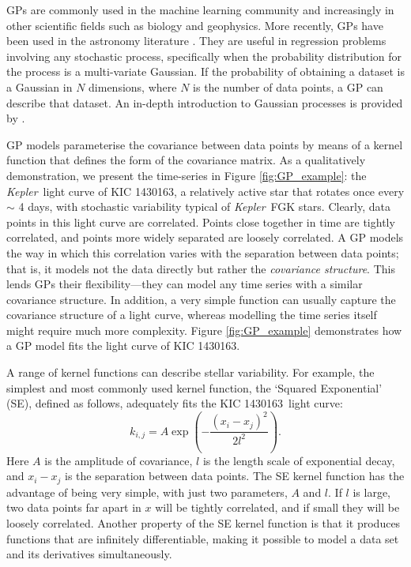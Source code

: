 \documentclass[useAMS, usenatbib, preprint, 12pt]{aastex}
\newcommand{\kepexample}{1430163}
\newcommand{\Kepler}{{\it Kepler}}
\newcommand{\kepler}{\Kepler}
\newcommand{\eg}{{\it e.g.}}
\begin{document}
GPs are commonly used in the machine learning community and increasingly
in other scientific fields such as biology and geophysics.
More recently, GPs have been used in the astronomy literature \citep[see
\eg][]{Gibson2012, Haywood2014, Haywood2015, Evans2015, Rajpaul2015,
Rajpaul2016, Aigrain2016}.
They are useful in regression problems involving any stochastic process,
specifically when the probability distribution for the process is a
multi-variate Gaussian.
If the probability of obtaining a dataset is a Gaussian in $N$ dimensions,
where $N$ is the number of data points, a GP can describe that dataset. 
An in-depth introduction to Gaussian processes is provided by
\citet{Rasmussen2005}.

GP models parameterise the covariance between data points by means of a kernel
function that defines the form of the covariance matrix.
As a qualitatively demonstration, we present the time-series 
in Figure \ref{fig:GP_example}: 
the \kepler\ light curve of KIC \kepexample, a relatively active star that
rotates once every $\sim$ 4 days, with stochastic variability typical of 
\kepler\ FGK stars.
Clearly, data points in this light curve are correlated.
Points close together in time are tightly correlated, and points more
widely separated are loosely correlated.
A GP models the way in which this correlation varies with the separation between 
data points; that is, it models not the data directly but rather the {\it 
covariance structure}.
This lends GPs their flexibility---they can model any time
series with a similar covariance structure.
In addition, a very simple function can usually capture the covariance
structure of a light curve, whereas modelling the time series itself
might require much more complexity.
Figure \ref{fig:GP_example} demonstrates how a GP model fits the light curve of 
KIC \kepexample.

A range of kernel functions can describe stellar variability.
For example, the simplest and most commonly used kernel function, the `Squared
Exponential' (SE), defined as follows, adequately fits the 
KIC \kepexample\ light curve:
\begin{equation}
k_{i,j} = A \exp \left(-\frac{(x_i - x_j)^2}{2l^2} \right).
\end{equation}
\label{eq:SE}
Here $A$ is the amplitude of covariance, $l$ is the length scale of
exponential decay, and $x_i-x_j$ is the separation between data points.
The SE kernel function has the advantage of being very simple, with
just two parameters, $A$ and $l$.
If $l$ is large, two data points far apart in $x$ will be tightly correlated,
and if small they will be loosely correlated.
Another property of the SE kernel function is that it produces functions that
are infinitely differentiable, making it possible to model a data set 
and its derivatives simultaneously.
\end{document}
